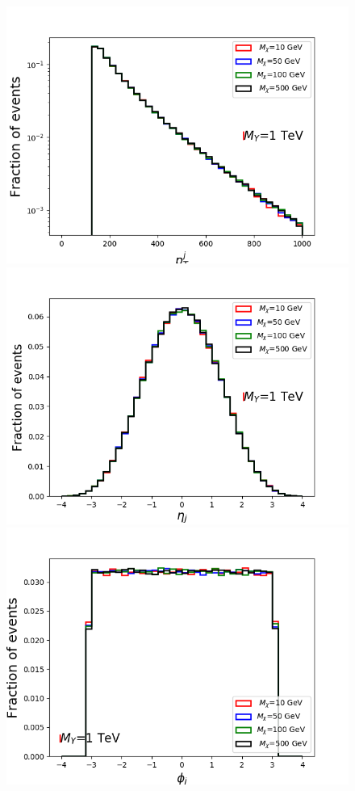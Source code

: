 \documentclass[prd,aps,letterpaper,floatfix,superscriptaddress,preprintnumbers,twocolumn,10pt,nofootinbib]{revtex4-1}
\begin{document}
\begin{figure} [H]
\begin{center}
\includegraphics[scale=0.26]{figures/ptjS1med1tev.png}
\includegraphics[scale=0.26]{figures/etajS1med1tev.png}
\includegraphics[scale=0.26]{figures/phijS1med1tev.png}

\end{center}
\end{figure}
\end{document}
